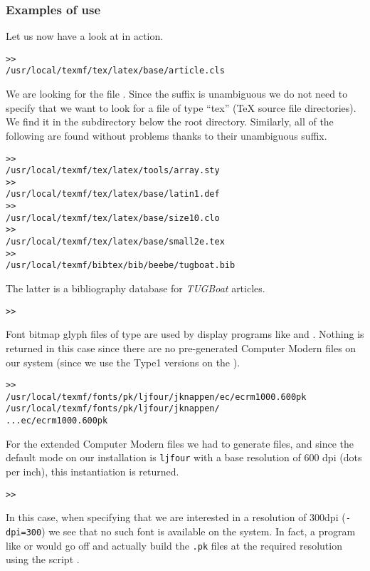 \documentclass{article}
\let\textsl\textit
\begin{document}
\begin{multicols}{2}
\subsubsection{Examples of use}
\label{SExamplesofuse}

Let us now have a look at \KPS{} in action.

\begin{alltt}
>> 
/usr/local/texmf/tex/latex/base/article.cls
\end{alltt}
We are looking for the file . Since the 
suffix is unambiguous we do not need to specify that we want to look for a
file of type ``tex'' (\TeX{} source file directories). We find it in
the subdirectory  below the  root
directory.  Similarly, all of the following are found without problems
thanks to their unambiguous suffix.
\begin{alltt}
>> 
   /usr/local/texmf/tex/latex/tools/array.sty
>> 
   /usr/local/texmf/tex/latex/base/latin1.def
>> 
   /usr/local/texmf/tex/latex/base/size10.clo
>> 
   /usr/local/texmf/tex/latex/base/small2e.tex
>> 
   /usr/local/texmf/bibtex/bib/beebe/tugboat.bib
\end{alltt}

The latter is a \BibTeX{} bibliography database for \textsl{TUGBoat} articles.

\begin{alltt}
>> 
\end{alltt}
Font bitmap glyph files of type  are used by display
programs like  and .  Nothing is returned in
this case since there are no pre-generated Computer Modern 
files on our system (since we use the Type1 versions on the \CD{}).
\begin{alltt}
>> 
\ifSingleColumn   /usr/local/texmf/fonts/pk/ljfour/jknappen/ec/ecrm1000.600pk
\else
/usr/local/texmf/fonts/pk/ljfour/jknappen/
...                         ec/ecrm1000.600pk
\fi\end{alltt}
For the extended Computer Modern files we had to generate 
files, and since the default \MF{} mode on our installation is
\texttt{ljfour} with a base resolution of 600 dpi (dots per inch),
this instantiation is returned.
\begin{alltt}
>> 
\end{alltt}
In this case, when specifying that we are interested in a resolution
of 300dpi (\texttt{-dpi=300}) we see that no such font is available on
the system. In fact, a program like  or  would
go off and actually build the \texttt{.pk} files at the required
resolution using the script .


\end{multicols}
\end{document}
